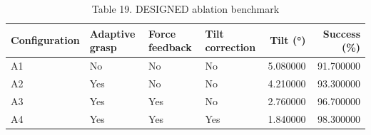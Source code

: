\begin{table}
\caption{Table 19. DESIGNED ablation benchmark}
\label{tab:table19}
\begin{tabular}{llllrr}
\toprule
Configuration & Adaptive grasp & Force feedback & Tilt correction & Tilt (°) & Success (\%) \\
\midrule
A1 & No & No & No & 5.080000 & 91.700000 \\
A2 & Yes & No & No & 4.210000 & 93.300000 \\
A3 & Yes & Yes & No & 2.760000 & 96.700000 \\
A4 & Yes & Yes & Yes & 1.840000 & 98.300000 \\
\bottomrule
\end{tabular}
\end{table}
